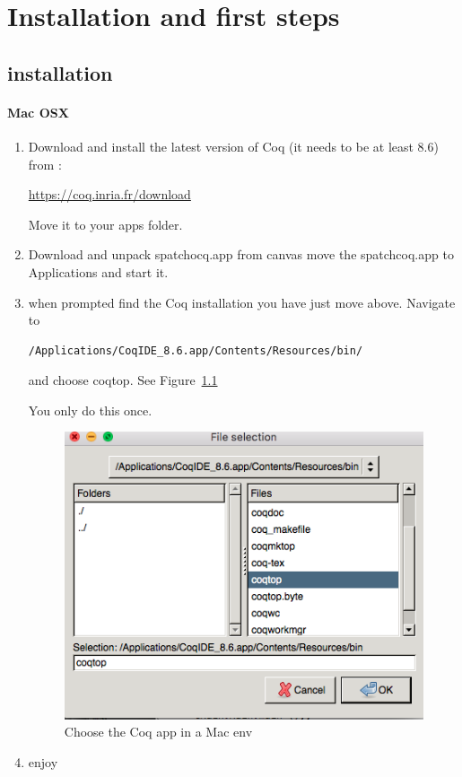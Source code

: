 

\part{ Installation and first steps }
\chapter{installation}
\subsection{Mac OSX}
\begin{enumerate}
\item Download and install  the latest version of Coq (it needs to be at least 8.6) from :

\href{https://coq.inria.fr/download}{https://coq.inria.fr/download}

Move it to your apps folder.


\item  Download and unpack spatchocq.app from canvas
move the spatchcoq.app to Applications and start it. 

\item when prompted find the Coq installation you have just move above. Navigate to 
\begin{verbatim}
/Applications/CoqIDE_8.6.app/Contents/Resources/bin/
\end{verbatim}
and choose coqtop. See Figure~\ref{fig:macos}

You only do this once.

\begin{figure}\label{fig:macos}
\center
\includegraphics[scale=0.5]{Installation/macos.png}
\caption{Choose the Coq app in a Mac env}\label{fig:macos}
\end{figure}
\item enjoy

\end{enumerate}


